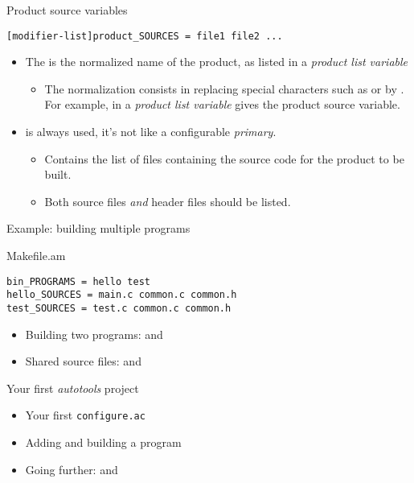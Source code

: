 \begin{frame}[fragile]{Product source variables}

    \begin{block}{}
{\small
\begin{verbatim}
[modifier-list]product_SOURCES = file1 file2 ...
\end{verbatim}}
\end{block}

\begin{itemize}

\item The  is the normalized name of the product, as
  listed in a {\em product list variable}
  \begin{itemize}
  \item The normalization consists in replacing special characters
    such as  or \code{+} by \code{_}. For example,
     in a {\em product list variable} gives the
     product source variable.
  \end{itemize}
\item {} is always used, it's not like a configurable {\em
    primary}.
  \begin{itemize}
  \item Contains the list of files containing the source code for the
    product to be built.
  \item Both source files {\em and} header files should be listed.
  \end{itemize}
\end{itemize}

\end{frame}

\begin{frame}[fragile]{Example: building multiple programs}
  \begin{block}{Makefile.am}
    {\small
\begin{verbatim}
bin_PROGRAMS = hello test
hello_SOURCES = main.c common.c common.h
test_SOURCES = test.c common.c common.h
\end{verbatim}}
  \end{block}
  \begin{itemize}
  \item Building two programs:  and 
  \item Shared source files:  and 
  \end{itemize}
\end{frame}

\setuplabframe
{Your first {\em autotools} project}
{
  \begin{itemize}
  \item Your first {\tt configure.ac}
  \item Adding and building a program
  \item Going further:  and 
  \end{itemize}
}
